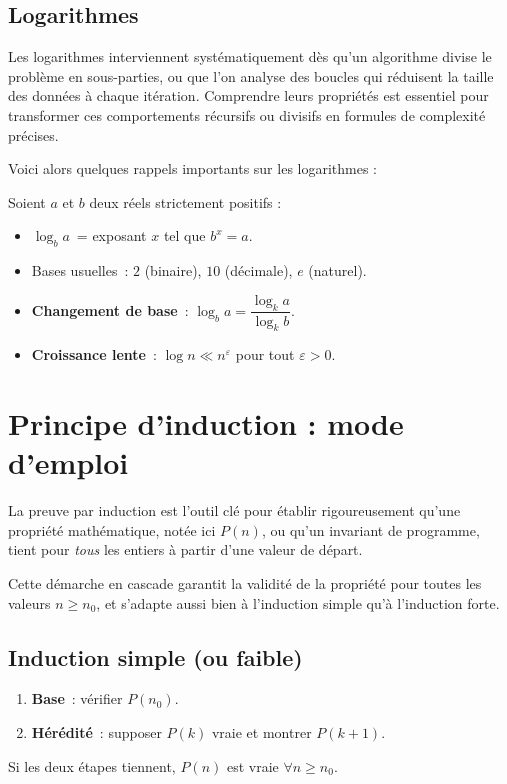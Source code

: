 \subsection{Logarithmes}
Les logarithmes interviennent systématiquement dès qu’un algorithme divise
le problème en sous-parties, ou que l’on analyse des
boucles qui réduisent la taille des données à chaque itération. Comprendre
leurs propriétés est essentiel pour
transformer ces comportements récursifs ou divisifs en formules de complexité précises.

Voici alors quelques rappels importants sur les logarithmes :

Soient $a$ et $b$ deux réels strictement positifs :

\begin{itemize}
  \item $\log_b a$ = exposant $x$ tel que $b^x=a$.
  \item Bases usuelles : $2$ (binaire), $10$ (décimale), $e$ (naturel).
  \item \textbf{Changement de base} : $\log_b a = \dfrac{\log_k a}{\log_k b}$.
  \item \textbf{Croissance lente} : $\log n\ll n^{\varepsilon}$ pour tout
        $\varepsilon>0$.
\end{itemize}


\section{Principe d’induction : mode d’emploi}
La preuve par induction est l’outil clé pour établir rigoureusement qu’une propriété mathématique, notée ici $P(n)$, ou qu’un invariant de programme, tient pour \emph{tous} les entiers à partir d’une valeur de départ.

Cette démarche en cascade garantit la validité de la propriété pour toutes les valeurs $n\ge n_{0}$, et s’adapte aussi bien à l’induction simple qu’à l’induction forte.

\subsection{Induction simple (ou faible)}
\begin{enumerate}
  \item \textbf{Base} : vérifier $P(n_0)$.
  \item \textbf{Hérédité} : supposer $P(k)$ vraie et montrer $P(k+1)$.
\end{enumerate}
Si les deux étapes tiennent, $P(n)$ est vraie $\forall n\ge n_0$.

